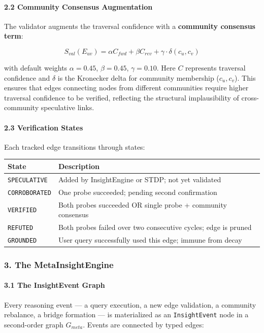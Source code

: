 \documentclass[10pt,journal,compsoc]{IEEEtran}
\begin{document}
\paragraph{2.2 Community Consensus Augmen\-tation}
The validator augments the traversal confidence with a \textbf{community consensus term}:

\begin{equation}
S_{val}(E_{uv}) = \alpha C_{fwd} + \beta C_{rev} + \gamma \cdot \delta(c_u, c_v)
\end{equation}

with default weights $\alpha=0.45$, $\beta=0.45$, $\gamma=0.10$. Here $C$ represents traversal confidence and $\delta$ is the Kronecker delta for community membership ($c_u, c_v$). This ensures that edges connecting nodes from different communities require higher traversal confidence to be verified, reflecting the structural impla\-usibility of cross-community speculative links.

\paragraph{2.3 Verifi\-cation States}
Each tracked edge transitions through states:

\begin{center}
\begin{tabularx}{\columnwidth}{|>{\raggedright\arraybackslash}X|>{\raggedright\arraybackslash}X|}
\hline
State & Description \\ \hline
\texttt{SPECULATIVE} & Added by InsightEngine or STDP; not yet validated \\ \hline
\texttt{CORROBORATED} & One probe succeeded; pending second confi\-rmation \\ \hline
\texttt{VERIFIED} & Both probes succeeded OR single probe + community consensus \\ \hline
\texttt{REFUTED} & Both probes failed over two consecutive cycles; edge is pruned \\ \hline
\texttt{GROUNDED} & User query succe\-ssfully used this edge; immune from decay \\ \hline
\end{tabularx}
\end{center}

\subsubsection{3. The MetaInsightEngine}

\paragraph{3.1 The InsightEvent Graph}
Every reasoning event — a query execution, a new edge validation, a community rebalance, a bridge formation — is mater\-ialized as an \texttt{InsightEvent} node in a second-order graph $G_{meta}$. Events are connected by typed edges:
\end{document}
